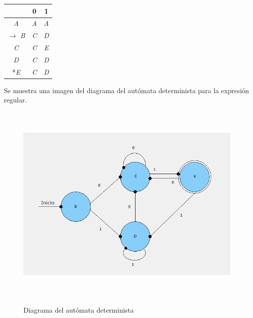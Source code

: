 \documentclass[12pt,letterpaper]{article}
\begin{document}
\begin{center}
\begin{tabular}{| c || c | c | } \hline
 & 0 & 1 \\
\hline\hline
\textit{A} & \textit{A} & \textit{A} \\
\hline
$\rightarrow$ \textit{B} & \textit{C} & \textit{D} \\
\hline
\textit{C} & \textit{C} & \textit{E} \\
\hline
\textit{D} & \textit{C} & \textit{D} \\
\hline
*\textit{E} & \textit{C} & \textit{D} \\
\hline
\end{tabular}
\end{center}
\justify
\newpage
Se muestra una imagen del diagrama del aut\'omata determinista para la expresi\'on regular.\\

\begin{figure}[H]
\includegraphics[width=\textwidth, height=10cm]{RE2.png}
\label{fig: busqueda}
\caption{Diagrama del aut\'omata determinista}
\end{figure}
\end{document}
